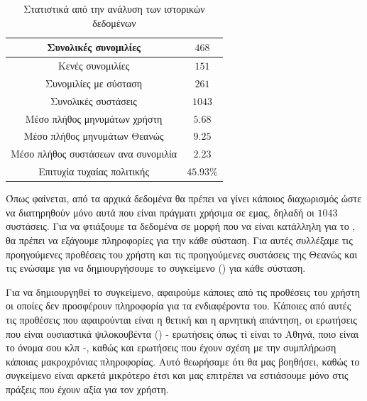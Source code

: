 \begin{table}
    \centering
    \begin{tabular}{|c|c|}
        \hline
        Συνολικές συνομιλίες                & $468$     \\
        \hline
        Κενές συνομιλίες                    & $151$     \\
        \hline
        Συνομιλίες με σύσταση               & $261$     \\
        \hline
        Συνολικές συστάσεις                 & $1043$    \\
        \hline
        Μέσο πλήθος μηνυμάτων χρήστη        & $5.68$    \\
        \hline
        Μέσο πλήθος μηνυμάτων Θεανώς        & $9.25$    \\
        \hline
        Μέσο πλήθος συστάσεων ανα συνομιλία & $2.23$    \\
        \hline
        Επιτυχία τυχαίας πολιτικής          & $45.93\%$ \\
        \hline
    \end{tabular}
    \caption{Στατιστικά από την ανάλυση των ιστορικών δεδομένων}
    \label{tab:historic_data}
\end{table}

Όπως φαίνεται, από τα αρχικά δεδομένα θα πρέπει να γίνει κάποιος διαχωρισμός ώστε να διατηρηθούν μόνο αυτά που είναι πράγματι χρήσιμα σε εμας, δηλαδή οι $1043$ συστάσεις. Για να φτιάξουμε τα δεδομένα σε μορφή που να είναι κατάλληλη για το , θα πρέπει να εξάγουμε πληροφορίες για την κάθε σύσταση. Για αυτές συλλέξαμε τις προηγούμενες προθέσεις του χρήστη και τις προηγούμενες συστάσεις της Θεανώς και τις ενώσαμε για να δημιουργήσουμε το συγκείμενο () για κάθε σύσταση.

Για να δημιουργηθεί το συγκείμενο, αφαιρούμε κάποιες από τις προθέσεις του χρήστη οι οποίες δεν προσφέρουν πληροφορία για τα ενδιαφέροντα του. Κάποιες από αυτές τις προθέσεις που αφαιρούνται είναι η θετική και η αρνητική απάντηση, οι ερωτήσεις που είναι ουσιαστικά ψιλοκουβέντα () - ερωτήσεις όπως τί είναι το Αθηνά, ποιο είναι το όνομα σου κλπ -, καθώς και ερωτήσεις που έχουν σχέση με την συμπλήρωση κάποιας μακροχρόνιας πληροφορίας. Αυτό θεωρήσαμε ότι θα μας βοηθήσει, καθώς το συγκείμενο είναι αρκετά μικρότερο έτσι και μας επιτρέπει να εστιάσουμε μόνο στις πράξεις που έχουν αξία για τον χρήστη.

